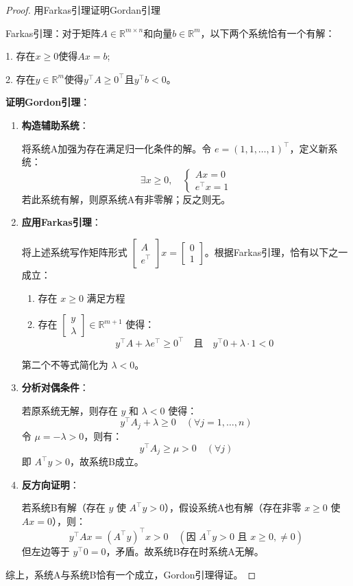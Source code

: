 \documentclass[12pt, a4paper, oneside, UTF8]{ctexbook}
\begin{document}
\begin{proof}
    用Farkas引理证明Gordan引理

    Farkas引理：对于矩阵$A \in \mathbb{R}^{m \times n}$和向量$b \in \mathbb{R}^m$，以下两个系统恰有一个有解：

1. 存在$x \geq 0$使得$Ax = b$;

2. 存在$y \in \mathbb{R}^m$使得$y^\top A \geq 0^\top$且$y^\top b < 0$。

\textbf{证明Gordon引理}：

\begin{enumerate}
    \item \textbf{构造辅助系统}：
    
    将系统A加强为存在满足归一化条件的解。令 \( e = (1,1,\dots,1)^\top \)，定义新系统：
    \[
    \exists x \geq 0,\quad 
    \begin{cases}
        Ax = 0 \\
        e^\top x = 1
    \end{cases}
    \]
    若此系统有解，则原系统A有非零解；反之则无。

    \item \textbf{应用Farkas引理}：
    
    将上述系统写作矩阵形式 \( \begin{bmatrix} A \\ e^\top \end{bmatrix} x = \begin{bmatrix} 0 \\ 1 \end{bmatrix} \)。根据Farkas引理，恰有以下之一成立：
    \begin{enumerate}
        \item 存在 \( x \geq 0 \) 满足方程
        \item 存在 \( \begin{bmatrix} y \\ \lambda \end{bmatrix} \in \mathbb{R}^{m+1} \) 使得：
        \[
        y^\top A + \lambda e^\top \geq 0^\top \quad \text{且} \quad y^\top 0 + \lambda \cdot 1 < 0
        \]
    \end{enumerate}
    第二个不等式简化为 \( \lambda < 0 \)。

    \item \textbf{分析对偶条件}：
    
    若原系统无解，则存在 \( y \) 和 \( \lambda < 0 \) 使得：
    \[
    y^\top A_j + \lambda \geq 0 \quad (\forall j=1,\dots,n)
    \]
    令 \( \mu = -\lambda > 0 \)，则有：
    \[
    y^\top A_j \geq \mu > 0 \quad (\forall j)
    \]
    即 \( A^\top y > 0 \)，故系统B成立。

    \item \textbf{反方向证明}：
    
    若系统B有解（存在 \( y \) 使 \( A^\top y > 0 \)），假设系统A也有解（存在非零 \( x \geq 0 \) 使 \( Ax = 0 \)），则：
    \[
    y^\top A x = (A^\top y)^\top x > 0 \quad (\text{因 } A^\top y > 0 \text{ 且 } x \geq 0, \neq 0)
    \]
    但左边等于 \( y^\top 0 = 0 \)，矛盾。故系统B存在时系统A无解。
\end{enumerate}

综上，系统A与系统B恰有一个成立，Gordon引理得证。
\end{proof}
\end{document}
